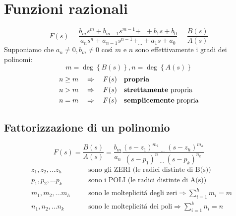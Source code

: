 \documentclass[../main.tex]{subfiles}
\begin{document}
	\section{Funzioni razionali}
		\[
			F(s) = \frac{b_m s^m + b_{m-1} s^{m-1} + _{\dots} + b_1 s + b_0}{a_n s^n + a_{n-1} s^{n-1} + _{\dots} + a_1 s + a_0 } = \frac{B(s)}{A(s)}
		\]
		Supponiamo che $ a_n \neq 0, b_m \neq 0 $ cos\'{\i} $ m $ e $ n $ sono effettivamente i gradi dei polinomi: 
		\[
			m = \deg\left\lbrace B(s) \right\rbrace, n=\deg \left\lbrace A(s) \right\rbrace
		\]
		\begin{align*}
			n \geq m \quad &\Rightarrow \quad F(s) \quad \text{\textbf{propria}}
			\\
			n > m \quad &\Rightarrow \quad F(s) \quad \text{\textbf{strettamente} propria}
			\\
			n = m \quad &\Rightarrow \quad F(s) \quad \text{\textbf{semplicemente} propria}
		\end{align*}
		
	\subsection{Fattorizzazione di un polinomio}
		\[
			F(s) = \frac{B(s)}{A(s)} = \frac{b_m}{a_n} \frac{(s-z_1)^{m_1}\: _{\dots}\: (s-z_h)^{m_h}}{(s-p_1)^n\: _{\dots}\: (s-p_k)^{n_k}}
		\]
		\begin{align*}
			&z_1, z_2, \dots z_h \quad &&\text{sono gli ZERI (le radici distinte di B(s))}
			\\
			&p_1, p_2, \dots p_k \quad &&\text{sono i POLI (le radici distinte di A(s))}
			\\
			&m_1, m_2, \dots m_h \quad &&\text{sono le molteplicit\'{a} degli zeri} \Rightarrow \sum_{i=1}^{h}m_i = m
			\\
			&n_1, n_2, \dots n_k \quad &&\text{sono le molteplicit\'{a} dei poli} \Rightarrow \sum_{i=1}^{k}n_i = n
		\end{align*}
		
\end{document}
